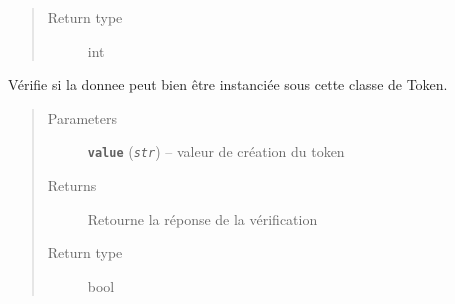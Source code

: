 \documentclass[letterpaper,10pt,english]{sphinxmanual}
\begin{document}
\begin{fulllineitems}
\begin{fulllineitems}
\begin{quote}
\begin{description}
\item[{Return type}] \leavevmode
int

\end{description}\end{quote}

\end{fulllineitems}


\begin{fulllineitems}
\label{loganalyser:loganalyser.token.Token._Token__verifier_type}
Vérifie si la donnee peut bien être instanciée sous cette classe de Token.
\begin{quote}\begin{description}
\item[{Parameters}] \leavevmode
\textbf{\texttt{value}} (\emph{\texttt{str}}) -- valeur de création du token

\item[{Returns}] \leavevmode
Retourne la réponse de la vérification

\item[{Return type}] \leavevmode
bool

\end{description}\end{quote}

\end{fulllineitems}


\end{fulllineitems}

\end{document}
